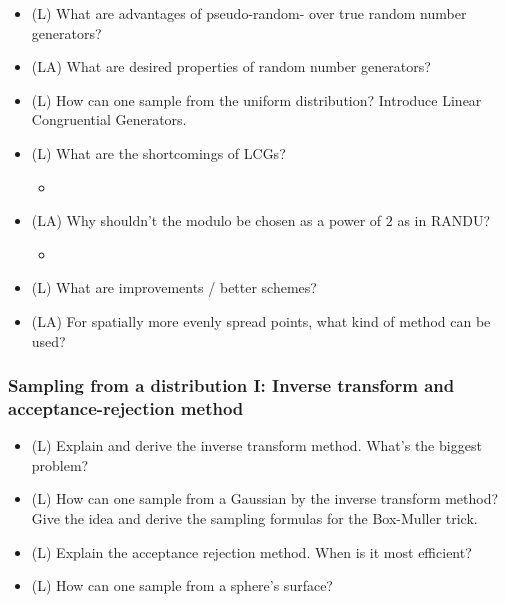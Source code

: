 \begin{itemize}
    \item (L) What are advantages of pseudo-random- over true random number generators?
    \item (LA) What are desired properties of random number generators?
    \item (L) How can one sample from the uniform distribution? Introduce Linear Congruential Generators.
    \item (L) What are the shortcomings of LCGs?
    \begin{itemize}
        \item {}
    \end{itemize}
    \item (LA) Why shouldn't the modulo be chosen as a power of $2$ as in RANDU?
    \begin{itemize}
        \item {}
    \end{itemize}
    \item (L) What are improvements / better schemes?
    \item (LA) For spatially more evenly spread points, what kind of method can be used?
\end{itemize}

\subsubsection*{Sampling from a distribution I: Inverse transform and acceptance-rejection method}
\begin{itemize}
    \item (L) Explain and derive the inverse transform method. What's the biggest problem?
    \item (L) How can one sample from a Gaussian by the inverse transform method? Give the idea and derive the sampling formulas for the Box-Muller trick.
    \item (L) Explain the acceptance rejection method. When is it most efficient?
    \item (L) How can one sample from a sphere's surface?
\end{itemize}

